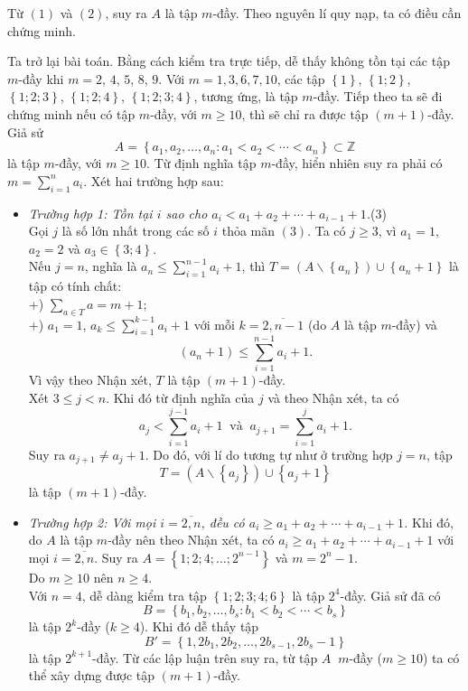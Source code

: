 \begin{bt}
{\begin{enumerate}[a)]
			Từ $(1)$ và $(2)$, suy ra $A$ là tập $m$-đầy. Theo nguyên lí quy nạp, ta có điều cần chứng minh.
		\end{enumerate}
		Ta trở lại bài toán. Bằng cách kiểm tra trực tiếp, dễ thấy không tồn tại các tập $m$-đầy khi $m=2$, $4$, $5$, $8$, $9$.
		Với $m=1,3,6,7,10$, các tập $\left\{1\right\}$, $\left\{1;2\right\}$, $\left\{1;2;3\right\}$, $\left\{1;2;4\right\}$, $\left\{1;2;3;4\right\}$, tương ứng,  là tập $m$-đầy.
		Tiếp theo ta sẽ đi chứng minh nếu có tập $m$-đầy, với $m\ge 10$, thì sẽ chỉ ra được tập $(m+1)$-đầy.
		Giả sử 
		$$A=\left\{a_1,a_2,\ldots,a_n: a_1<a_2<\cdots<a_n\right\}\subset\mathbb{Z}$$
		là tập $m$-đầy, với $m\ge 10$. Từ định nghĩa tập $m$-đầy, hiển nhiên suy ra phải có $m=\displaystyle\sum\limits_{i=1}^{n}a_i$. Xét hai trường hợp sau:
		\begin{itemize}
			\item \textit{Trường hợp 1: Tồn tại $i$ sao cho $a_i<a_1+a_2+\cdots+a_{i-1}+1$.}\hfill(3)\\
			Gọi $j$ là số lớn nhất trong các số $i$ thỏa mãn $(3)$. Ta có $j\ge 3$, vì $a_1=1$, $a_2=2$ và $a_3\in\left\{3;4\right\}$.\\
			Nếu $j=n$, nghĩa là  $a_n\le \displaystyle\sum\limits_{i=1}^{n-1}a_i+1$, thì $T=\left(A\backslash \left\{a_n\right\}\right)\cup\left\{a_n+1\right\}$ là tập có tính chất:\\
			+) $\displaystyle\sum\limits_{a\in T}a=m+1$;\\
			+) $a_1=1$, $a_k\le \displaystyle\sum\limits_{i=1}^{k-1}a_i+1$ với mỗi $k=\overline{2,n-1}$ (do $A$ là tập $m$-đầy) và $$\left(a_n+1\right)\le \sum\limits_{i=1}^{n-1}a_i+1.$$
			Vì vậy theo Nhận xét, $T$ là tập $(m+1)$-đầy.\\
			Xét $3\le j<n$. Khi đó từ định nghĩa của $j$ và theo Nhận xét, ta có $$a_j<\sum\limits_{i=1}^{j-1}a_i+1\;\;\text{và}\;\; a_{j+1}= \sum\limits_{i=1}^{j}a_i+1.$$ Suy ra $a_{j+1}\ne a_j+1$. Do đó, với lí do tương tự như ở trường hợp $j=n$, tập $$T=\left(A\backslash \left\{a_j\right\}\right)\cup\left\{a_j+1\right\}$$ là tập $(m+1)$-đầy.
			\item \textit{Trường hợp 2: Với mọi $i=\overline{2,n}$, đều có $a_i\ge a_1+a_2+\cdots+a_{i-1}+1$.} 
			Khi đó, do $A$ là tập $m$-đầy nên theo Nhận xét, ta có $a_i\ge a_1+a_2+\cdots+a_{i-1}+1$ với mọi $i=\overline{2,n}$. Suy ra $A=\left\{1;2;4;\ldots;2^{n-1}\right\}$ và $m=2^n-1$.\\
			Do $m\ge 10$ nên $n\ge 4$.\\
			Với $n=4$, dễ dàng kiểm tra tập $\left\{1;2;3;4;6\right\}$ là tập $2^4$-đầy. Giả sử đã có $$B=\left\{b_1,b_2,\ldots,b_s: b_1<b_2<\cdots<b_s\right\}$$
			là tập $2^k$-đầy ($k\ge 4$). Khi đó dễ thấy tập $$B'=\left\{1,2b_1,2b_2,\ldots,2b_{s-1},2b_s-1\right\}$$ là tập $2^{k+1}$-đầy.
			Từ các lập luận trên suy ra, từ tập $A\;\;m$-đầy ($m\ge 10$) ta có thể xây dựng được tập $(m+1)$-đầy.
	\end{itemize}
	}
\end{bt}
